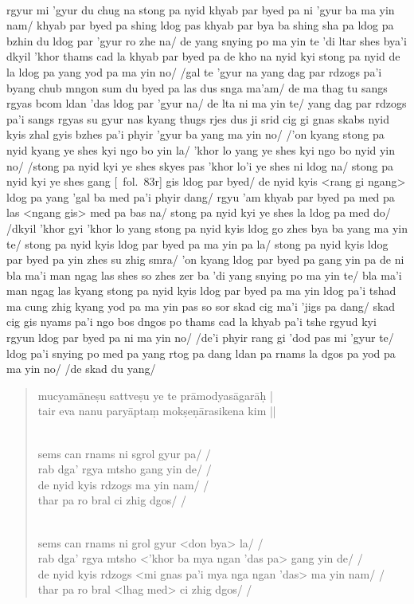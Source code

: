 \documentclass[12pt]{article}
\begin{document}
\textbf{\TVB}\\
rgyur mi 'gyur du chug na stong pa nyid khyab par byed pa ni 'gyur ba ma yin nam/ khyab par byed pa shing ldog pas khyab par bya ba shing sha pa ldog pa bzhin du ldog par 'gyur ro zhe na/ de yang snying po ma yin te 'di ltar shes bya'i dkyil 'khor thams cad la khyab par byed pa de kho na nyid kyi stong pa nyid de la ldog pa yang yod pa ma yin no/ /gal te 'gyur na yang dag par rdzogs pa'i byang chub mngon sum du byed pa las dus snga ma'am/ de ma thag tu sangs rgyas bcom ldan 'das ldog par 'gyur na/ de lta ni ma yin te/ yang dag par rdzogs pa'i sangs rgyas su gyur nas kyang thugs rjes dus ji srid cig gi gnas skabs nyid kyis zhal gyis bzhes pa'i phyir 'gyur ba yang ma yin no/ /'on kyang stong pa nyid kyang ye shes kyi ngo bo yin la/ 'khor lo yang ye shes kyi ngo bo nyid yin no/ /stong pa nyid kyi ye shes skyes pas 'khor lo'i ye shes ni ldog na/ stong pa nyid kyi ye shes gang [\TVB\ fol.\ 83r] gis ldog par byed/ de nyid kyis <rang gi ngang> ldog pa yang 'gal ba med pa'i phyir dang/ rgyu 'am khyab par byed pa med pa las <ngang gis> med pa bas na/ stong pa nyid kyi ye shes la ldog pa med do/ /dkyil 'khor gyi 'khor lo yang stong pa nyid kyis ldog go zhes bya ba yang ma yin te/ stong pa nyid kyis ldog par byed pa ma yin pa la/ stong pa nyid kyis ldog par byed pa yin zhes su zhig smra/ 'on kyang ldog par byed pa gang yin pa de ni bla ma'i man ngag las shes so zhes zer ba 'di yang snying po ma yin te/ bla ma'i man ngag las kyang stong pa nyid kyis ldog par byed pa ma yin ldog pa'i tshad ma cung zhig kyang yod pa ma yin pas so sor skad cig ma'i 'jigs pa dang/ skad cig gis nyams pa'i ngo bos dngos po thams cad la khyab pa'i tshe rgyud kyi rgyun ldog par byed pa ni ma yin no/ /de'i phyir rang gi 'dod pas mi 'gyur te/ ldog pa'i snying po med pa yang rtog pa dang ldan pa rnams la dgos pa yod pa ma yin no/ /de skad du yang/

\begin{quote}
	mucyamāneṣu sattveṣu ye te prāmodyasāgarāḥ | \\
	tair eva nanu paryāptaṃ mokṣeṇārasikena kim ||

	\textbf{\TVA}\\
	sems can rnams ni sgrol gyur pa/ /\\
	rab dga' rgya mtsho gang yin de/ /\\
	de nyid kyis rdzogs ma yin nam/ /\\
	thar pa ro bral ci zhig dgos/ /

	\textbf{\TVB}\\
	sems can rnams ni grol gyur <don bya> la/ /\\
	rab dga' rgya mtsho <'khor ba mya ngan 'das pa> gang yin de/ /\\
	de nyid kyis rdzogs <mi gnas pa'i mya nga ngan 'das> ma yin nam/ /\\
	thar pa ro bral <lhag med> ci zhig dgos/ /
\end{quote}
\end{document}
